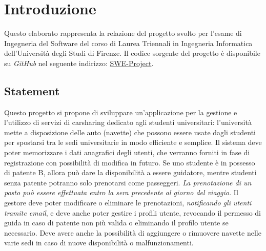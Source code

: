 \section{Introduzione}\label{sec:Introduzione}
Questo elaborato rappresenta la relazione del progetto svolto per l'esame di Ingegneria del Software del corso di Laurea Triennali in Ingegneria Informatica dell'Università degli Studi di Firenze.
Il codice sorgente del progetto è disponibile su \textit{GitHub} nel seguente indirizzo: \href{https://github.com/TommyAen/SWE-Project}{SWE-Project}.
\subsection{Statement}
Questo progetto si propone di sviluppare un'applicazione per la gestione e l'utilizzo di servizi di carsharing dedicato agli studenti universitari: l'università mette a disposizione delle auto (navette) che possono essere usate dagli studenti per spostarsi tra le sedi universitarie in modo efficiente e semplice.
\newline
Il sistema deve poter memorizzare i dati anagrafici degli utenti, che verranno forniti in fase di registrazione con possibilità di modifica in futuro.
Se uno studente è in possesso di patente B, allora può dare la disponibilità a essere guidatore, mentre studenti senza patente potranno solo prenotarsi come passeggeri.
\newline
\textit{La prenotazione di un posto può essere effettuata entro la sera precedente al giorno del viaggio.}
\newline
Il gestore deve poter modificare o eliminare le prenotazioni, \textit{notificando gli utenti tramite email}, e deve anche poter gestire i profili utente, revocando il permesso di guida in caso di patente non più valida o eliminando il profilo utente se necessario. 
Deve avere anche la possibilità di aggiungere o rimuovere navette nelle varie sedi in caso di nuove disponibilità o malfunzionamenti.

